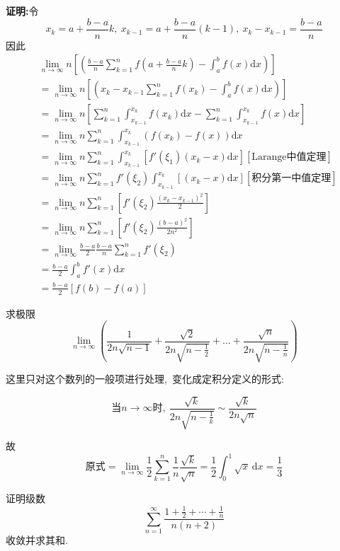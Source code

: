 	\textbf{证明:}令
	$$x_k=a+\frac{b-a}{n}k,\ x_{k-1}=a+\frac{b-a}{n}(k-1),\ x_k-x_{k-1}=\frac{b-a}{n}$$
	因此
	\begin{align*}  
		&\lim\limits_{n\rightarrow\infty}n\left[\left(\frac{b-a}{n}\sum\limits_{k=1}^{n}f\left(a+\frac{b-a}{n}k\right)-\int_{a}^{b}f(x)\text{d}x\right)\right]\\
		&=\lim\limits_{n\rightarrow\infty}n\left[\left(x_k-x_{k-1}\sum\limits_{k=1}^{n}f\left(x_k\right)-\int_{a}^{b}f(x)\text{d}x\right)\right]\\
		&=\lim\limits_{n\rightarrow\infty}n\left[\sum\limits_{k=1}^{n}\int_{x_{k-1
		}}^{x_k}f(x_k)\text{d}x-\sum\limits_{k=1}^{n}\int_{x_{k-1
		}}^{x_k}f(x)\text{d}x\right]\\
		&=\lim\limits_{n\rightarrow\infty}n\sum\limits_{k=1}^{n}\int_{x_{k-1
		}}^{x_k}(f(x_k)-f(x))\text{d}x\\
		&=\lim\limits_{n\rightarrow\infty}n\sum\limits_{k=1}^{n}\int_{x_{k-1
		}}^{x_k}\left[f'(\xi_1)(x_k-x)\text{d}x\right]\left[\text{Larange中值定理}\right]\\
		&=\lim\limits_{n\rightarrow\infty}n\sum\limits_{k=1}^{n}f'(\xi_2)\int_{x_{k-1
		}}^{x_k}\left[(x_k-x)\text{d}x\right]\left[\text{积分第一中值定理}\right]\\
		&=\lim\limits_{n\rightarrow\infty}n\sum\limits_{k=1}^{n}\left[f'(\xi_2)\frac{(x_k-x_{k-1})^2}{2}\right]\\
		&=\lim\limits_{n\rightarrow\infty}n\sum\limits_{k=1}^{n}\left[f'(\xi_2)\frac{(b-a)^2}{2n^2}\right]\\
		&=\lim\limits_{n\rightarrow\infty}\frac{b-a}{2}\frac{b-a}{n}\sum\limits_{k=1}^{n}f'(\xi_2)\\
		&=\frac{b-a}{2}\int_{a}^{b}f'(x)\text{d}x\\
		&=\frac{b-a}{2}\left[f(b)-f(a)\right]
	\end{align*}
	\newpage
	\begin{problem}
		求极限$$\lim\limits_{n\rightarrow \infty}\left(\frac{1}{2n\sqrt{n-1}}+\frac{\sqrt{2}}{2n\sqrt{n-\frac{1}{2}}}+\dots+\frac{\sqrt{n}}{2n\sqrt{n-\frac{1}{n}}}\right)$$
	\end{problem}
	
	\begin{solution}
		这里只对这个数列的一般项进行处理,\ 变化成定积分定义的形式:
		
		$$\text{当}n\rightarrow\infty\text{时},\ \frac{\sqrt{k}}{2n\sqrt{n-\frac{1}{k}}}\sim\frac{\sqrt{k}}{2n\sqrt{n}}$$
		
		故$$\text{原式}=\lim\limits_{n\rightarrow\infty}\frac{1}{2}\sum\limits_{k=1}^{n}\frac{1}{n}\frac{\sqrt{k}}{\sqrt{n}}=\frac{1}{2}\int_{0}^{1}\sqrt{x}\,\mathrm{d}x=\frac{1}{3}$$
	\end{solution}
	\newpage
	\begin{problem}
		证明级数
		$$\sum\limits_{n=1}^{\infty}\frac{1+\frac{1}{2}+\cdots+\frac{1}{n}}{n(n+2)}$$
		收敛并求其和.
	\end{problem}
	
